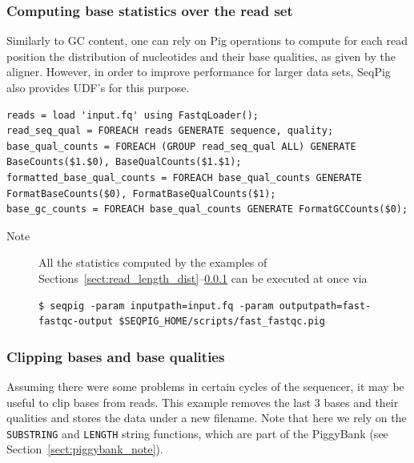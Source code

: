 {\subsubsection{Computing base statistics over the read set}

\label{sect:base_stats}

Similarly to GC content, one can rely on Pig operations to compute for
each read position the distribution of nucleotides and their base
qualities, as given by the aligner. However, in order to improve
performance for larger data sets, SeqPig also provides UDF's for this
purpose.

\begin{lstlisting}
reads = load 'input.fq' using FastqLoader();
read_seq_qual = FOREACH reads GENERATE sequence, quality;
base_qual_counts = FOREACH (GROUP read_seq_qual ALL) GENERATE BaseCounts($1.$0), BaseQualCounts($1.$1);
formatted_base_qual_counts = FOREACH base_qual_counts GENERATE FormatBaseCounts($0), FormatBaseQualCounts($1);
base_gc_counts = FOREACH base_qual_counts GENERATE FormatGCCounts($0);
\end{lstlisting}

\begin{description}
	\item[Note] All the statistics computed by the examples of Sections~\ref{sect:read_length_dist}--\ref{sect:base_stats} can be executed at once via
\begin{lstlisting}
$ seqpig -param inputpath=input.fq -param outputpath=fast-fastqc-output $SEQPIG_HOME/scripts/fast_fastqc.pig
\end{lstlisting}
\end{description}

\subsubsection{Clipping bases and base qualities}

\label{sect:read_clipping}

Assuming there were some problems in certain cycles of the sequencer,
it may be useful to clip bases from reads. This example removes the
last 3 bases and their qualities and stores the data under a new
filename. Note that here we rely on the {\tt SUBSTRING} and {\tt LENGTH}
string functions, which are part of the PiggyBank (see
Section~\ref{sect:piggybank_note}).

}
